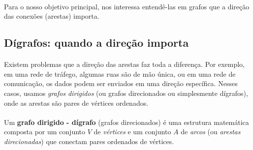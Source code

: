 \documentclass[12pt,a4paper]{article}
\begin{document}
\begin{center}
\label{fig:arvore}
\end{center}

\paragraph{}
Para o nosso objetivo principal, nos interessa entendê-las em grafos que a direção das conexões (arestas) importa.

\subsection{Dígrafos: quando a direção importa}
\paragraph{}
Existem problemas que a direção das arestas faz toda a diferença. Por exemplo, em uma rede de tráfego, algumas ruas são de mão única, ou em uma rede de comunicação, os dados podem ser enviados em uma direção específica. Nesses casos, usamos \emph{grafos dirigidos} (ou grafos direcionados ou simplesmente dígrafos), onde as arestas são pares de vértices ordenados.

\paragraph{}
Um \textbf{grafo dirigido - dígrafo} (grafos direcionados) é uma estrutura matemática composta por um conjunto \(V\) de \emph{vértices} e um conjunto \(A\) de \emph{arcos} (ou \emph{arestas direcionadas}) que conectam pares ordenados de vértices.
\end{document}
